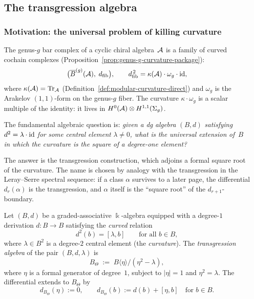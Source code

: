\subsection{The transgression algebra}
\label{subsec:transgression-algebra}

\subsubsection{Motivation: the universal problem of killing curvature}
\label{subsubsec:transgression-motivation}

The genus-$g$ bar complex of a cyclic chiral algebra~$\mathcal{A}$ is a family
of curved cochain complexes
(Proposition~\ref{prop:genus-g-curvature-package}):
\begin{equation}\label{eq:g9-curved-bar}
\bigl(\overline{B}^{(g)}(\mathcal{A}),\; d_{\mathrm{fib}}\bigr),
\qquad
d_{\mathrm{fib}}^{\,2} = \kappa(\mathcal{A}) \cdot \omega_g \cdot \mathrm{id},
\end{equation}
where $\kappa(\mathcal{A}) = \mathrm{Tr}_{\mathcal{A}}$
(Definition~\ref{def:modular-curvature-direct}) and $\omega_g$ is the
Arakelov $(1,1)$-form on the genus-$g$ fiber. The curvature
$\kappa \cdot \omega_g$ is a scalar multiple of the identity:
it lives in $H^0(\mathcal{A}) \otimes H^{1,1}(\Sigma_g)$.

The fundamental algebraic question is: \emph{given a dg algebra $(B, d)$
satisfying $d^2 = \lambda \cdot \mathrm{id}$ for some central element
$\lambda \ne 0$, what is the universal extension of~$B$ in which
the curvature is the square of a degree-one element?}

The answer is the transgression construction, which adjoins a formal
square root of the curvature. The name is chosen by analogy with the
transgression in the Leray--Serre spectral sequence: if a class $\alpha$
survives to a later page, the differential $d_r(\alpha)$ is the
transgression, and $\alpha$ itself is the ``square root'' of the
$d_{r+1}$-boundary.

\begin{definition}
\label{def:transgression-algebra}
Let $(B, d)$ be a graded-associative $\Bbbk$-algebra
equipped with a degree-$1$ derivation $d\colon B \to B$ satisfying the
\emph{curved} relation
\begin{equation}\label{eq:g9-curved-relation}
d^2(b) = [\lambda, b]
\qquad
\text{for all } b \in B,
\end{equation}
where $\lambda \in B^2$ is a degree-$2$ central element (the
\emph{curvature}). The \emph{transgression algebra} of the pair
$(B, d, \lambda)$ is
\begin{equation}\label{eq:g9-transgression-def}
B_\Theta
\;:=\;
B\langle \eta \rangle \big/ (\eta^2 - \lambda),
\end{equation}
where $\eta$ is a formal generator of degree~$1$, subject to
$|\eta| = 1$ and $\eta^2 = \lambda$. The differential extends to
$B_\Theta$ by
\begin{equation}\label{eq:g9-transgression-diff}
d_{B_\Theta}(\eta) := 0,
\qquad
d_{B_\Theta}(b) := d(b) + [\eta, b]
\quad\text{for } b \in B.
\end{equation}
\end{definition}

